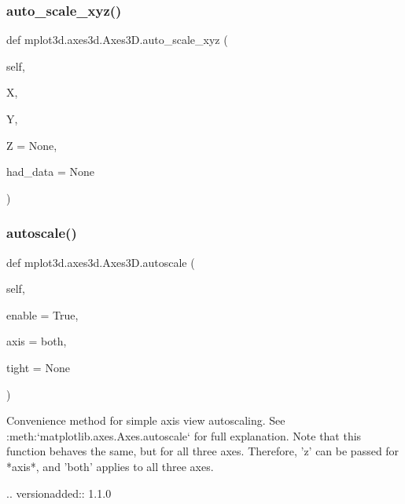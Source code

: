 \subsubsection{\texorpdfstring{auto\+\_\+scale\+\_\+xyz()}{auto\_scale\_xyz()}}
{\footnotesize\ttfamily def mplot3d.\+axes3d.\+Axes3\+D.\+auto\+\_\+scale\+\_\+xyz (\begin{DoxyParamCaption}\item[{}]{self,  }\item[{}]{X,  }\item[{}]{Y,  }\item[{}]{Z = {\ttfamily None},  }\item[{}]{had\+\_\+data = {\ttfamily None} }\end{DoxyParamCaption})}

\mbox{\label{classmplot3d_1_1axes3d_1_1Axes3D_aa4e3927000687d7225ea7f42b2066032}} 
\subsubsection{\texorpdfstring{autoscale()}{autoscale()}}
{\footnotesize\ttfamily def mplot3d.\+axes3d.\+Axes3\+D.\+autoscale (\begin{DoxyParamCaption}\item[{}]{self,  }\item[{}]{enable = {\ttfamily True},  }\item[{}]{axis = {\ttfamily \textquotesingle{}both\textquotesingle{}},  }\item[{}]{tight = {\ttfamily None} }\end{DoxyParamCaption})}

\begin{DoxyVerb}Convenience method for simple axis view autoscaling.
See :meth:`matplotlib.axes.Axes.autoscale` for full explanation.
Note that this function behaves the same, but for all
three axes.  Therefore, 'z' can be passed for *axis*,
and 'both' applies to all three axes.

.. versionadded:: 1.1.0
\end{DoxyVerb}
 \mbox{\label{classmplot3d_1_1axes3d_1_1Axes3D_a4acb8c32eb03c5819d3ff1652c48153e}} 
